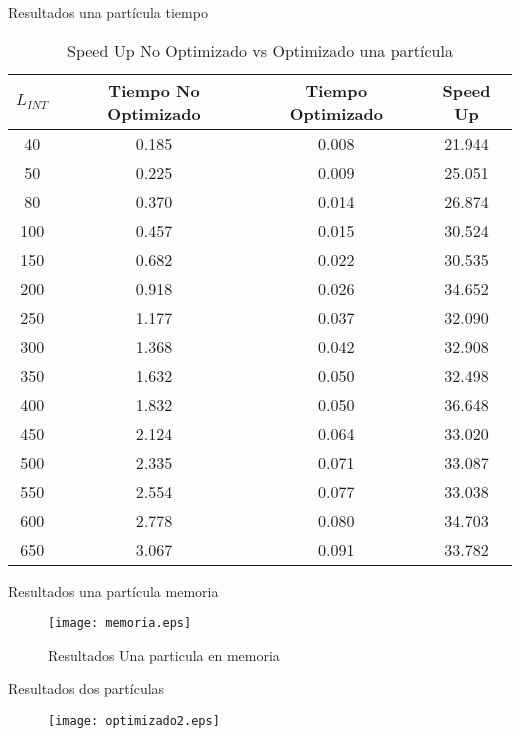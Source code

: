 \documentclass{beamer}
\begin{document}
\begin{frame}{Resultados una part\'icula tiempo}{}
\begin{table}[H]
\begin{center}

\small
\begin{tabular}{ |c|c|c|c| }
  \hline
  $L_{INT}$ & Tiempo No Optimizado & Tiempo Optimizado & Speed Up \\
  \hline
  40 & 0.185 & 0.008 & 21.944\\
  50 & 0.225 & 0.009 & 25.051\\
  80 & 0.370 & 0.014 & 26.874\\
  100 & 0.457 & 0.015 & 30.524\\
  150 & 0.682 & 0.022 & 30.535\\
  200 & 0.918 & 0.026 & 34.652\\
  250 & 1.177 & 0.037 & 32.090\\
  300 & 1.368 & 0.042 & 32.908\\
  350 & 1.632 & 0.050 & 32.498\\
  400 & 1.832 & 0.050 & 36.648\\
  450 & 2.124 & 0.064 & 33.020\\
  500 & 2.335 & 0.071 & 33.087\\
  550 & 2.554 & 0.077 & 33.038\\
  600 & 2.778 & 0.080 & 34.703\\
  650 & 3.067 & 0.091 & 33.782\\
  \hline
\end{tabular}
\caption{Speed Up No Optimizado vs Optimizado una part\'icula}
\label{table:speedup1par}
\end{center}
\end{table}
\end{frame}

\begin{frame}{Resultados una part\'icula memoria}{}
\begin{figure}[!tbp]
    \texttt{[image: memoria.eps]}
    \caption{Resultados Una particula en memoria}
  \end{figure}
\end{frame}

\begin{frame}{Resultados dos part\'iculas}{}
  \begin{figure}[h]
  \renewcommand\figurename{Gr\'agico}
  \begin{center}
    \leavevmode

    \texttt{[image: optimizado2.eps]}

  \end{center}
\end{figure}
\end{frame}
\end{document}
